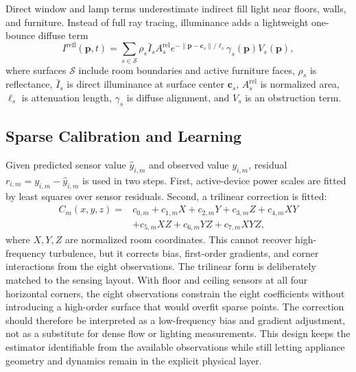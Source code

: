 \documentclass[conference]{IEEEtran}
\begin{document}
Direct window and lamp terms underestimate indirect fill light near floors, walls, and furniture. Instead of full ray tracing, illuminance adds a lightweight one-bounce diffuse term
\begin{equation}
I^{\mathrm{refl}}(\mathbf{p},t)=\sum_{s\in\mathcal{S}}\rho_s\bar I_sA_s^{\mathrm{rel}}e^{-\|\mathbf{p}-\mathbf{c}_s\|/\ell_s}\gamma_s(\mathbf{p})V_s(\mathbf{p}),
\end{equation}
where surfaces $\mathcal{S}$ include room boundaries and active furniture faces, $\rho_s$ is reflectance, $\bar I_s$ is direct illuminance at surface center $\mathbf{c}_s$, $A_s^{\mathrm{rel}}$ is normalized area, $\ell_s$ is attenuation length, $\gamma_s$ is diffuse alignment, and $V_s$ is an obstruction term.

\subsection{Sparse Calibration and Learning}
Given predicted sensor value $\hat y_{i,m}$ and observed value $y_{i,m}$, residual $r_{i,m}=y_{i,m}-\hat y_{i,m}$ is used in two steps. First, active-device power scales are fitted by least squares over sensor residuals. Second, a trilinear correction is fitted:
\begin{align}
C_m(x,y,z)={}&c_{0,m}+c_{1,m}X+c_{2,m}Y+c_{3,m}Z+c_{4,m}XY\nonumber\\
&+c_{5,m}XZ+c_{6,m}YZ+c_{7,m}XYZ,
\end{align}
where $X,Y,Z$ are normalized room coordinates. This cannot recover high-frequency turbulence, but it corrects bias, first-order gradients, and corner interactions from the eight observations.
The trilinear form is deliberately matched to the sensing layout. With floor and ceiling sensors at all four horizontal corners, the eight observations constrain the eight coefficients without introducing a high-order surface that would overfit sparse points. The correction should therefore be interpreted as a low-frequency bias and gradient adjustment, not as a substitute for dense flow or lighting measurements. This design keeps the estimator identifiable from the available observations while still letting appliance geometry and dynamics remain in the explicit physical layer.
\end{document}
